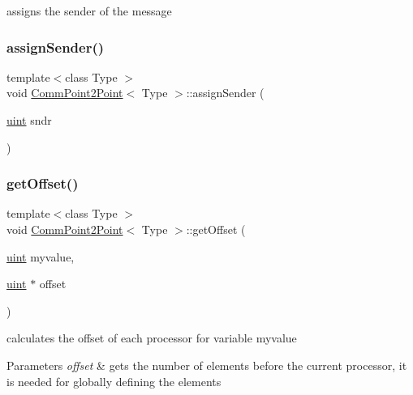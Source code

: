 assigns the sender of the message \mbox{\label{classCommPoint2Point_a26bf177b75a31154c5d008b0ac7364f0}} 
\subsubsection{\texorpdfstring{assign\+Sender()}{assignSender()}}
{\footnotesize\ttfamily template$<$class Type $>$ \\
void \mbox{\hyperlink{classCommPoint2Point}{Comm\+Point2\+Point}}$<$ Type $>$\+::assign\+Sender (\begin{DoxyParamCaption}\item[{\mbox{\hyperlink{definitions_8h_a69aa29b598b851b0640aa225a9e5d61d}{uint}}}]{sndr }\end{DoxyParamCaption})}

\mbox{\label{classCommPoint2Point_a9093c564a679e5df134859ed3841a84c}} 
\subsubsection{\texorpdfstring{get\+Offset()}{getOffset()}}
{\footnotesize\ttfamily template$<$class Type $>$ \\
void \mbox{\hyperlink{classCommPoint2Point}{Comm\+Point2\+Point}}$<$ Type $>$\+::get\+Offset (\begin{DoxyParamCaption}\item[{\mbox{\hyperlink{definitions_8h_a69aa29b598b851b0640aa225a9e5d61d}{uint}}}]{myvalue,  }\item[{\mbox{\hyperlink{definitions_8h_a69aa29b598b851b0640aa225a9e5d61d}{uint}} $\ast$}]{offset }\end{DoxyParamCaption})}

calculates the offset of each processor for variable myvalue 
\begin{DoxyParams}{Parameters}
{\em offset} & gets the number of elements before the current processor, it is needed for globally defining the elements \\
\hline
\end{DoxyParams}
\mbox{\label{classCommPoint2Point_a91a4f9779a315269bd95543254bfe0ff}} 
